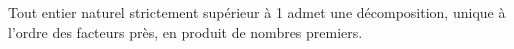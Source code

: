 
Tout entier naturel strictement supérieur à 1 admet une décomposition, unique à l'ordre des facteurs près, en produit de nombres premiers.




